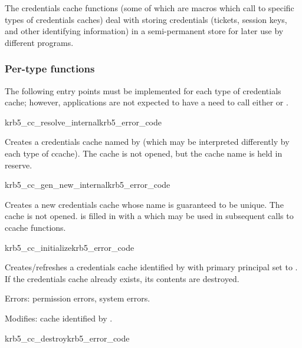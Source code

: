 The credentials cache functions (some of which are macros which call to
specific types of credentials caches) deal with storing credentials
(tickets, session keys, and other identifying information) in a
semi-permanent store for later use by different programs.

\subsubsection{Per-type functions}
The following entry points must be implemented for each type of
credentials cache; however, applications are not expected to have a need
to call either  or
.


\begin{funcdecl}{krb5_cc_resolve_internal}{krb5_error_code}{\funcout}
\funcin
{}
\end{funcdecl}

Creates a credentials cache named by  (which may be
interpreted differently by each type of ccache).  The cache is not
opened, but the cache name is held in reserve.

\begin{funcdecl}{krb5_cc_gen_new_internal}{krb5_error_code}{\funcout}
\end{funcdecl}

Creates a new credentials cache whose name is guaranteed to be
unique.  The cache is not opened.  is
filled in with a  which may be used in subsequent
calls to ccache functions.

\begin{funcdecl}{krb5_cc_initialize}{krb5_error_code}{\funcinout}
\funcin
{}
\end{funcdecl}

Creates/refreshes a credentials cache identified by  with
primary principal set to .
If the credentials cache already exists, its contents are destroyed.

Errors:  permission errors, system errors.

Modifies: cache identified by .

\begin{funcdecl}{krb5_cc_destroy}{krb5_error_code}{\funcin}
\end{funcdecl}

